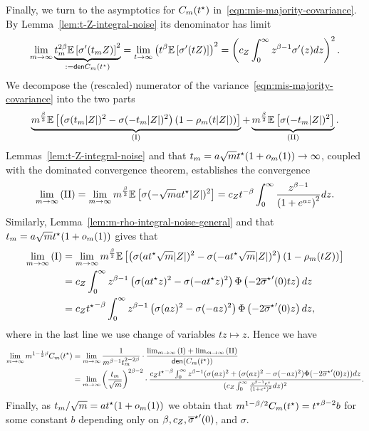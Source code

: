 Finally, we turn to the asymptotics for $C_m(t^\star)$
in~\eqref{eqn:mis-majority-covariance}.
By Lemma~\ref{lem:t-Z-integral-noise}
its denominator has limit
\begin{align*}
  \lim_{m \to \infty}
  \underbrace{t_m^{2 \beta} \mathbb{E}\left[\sigma'(t_m Z)\right]^2}_{:=
    \mathsf{den}{C_m(t^\star)}}
  = \lim_{t \to \infty}
  \left(t^\beta \mathbb{E}\left[\sigma'(t Z)\right]\right)^2
  = \left(c_Z\int_{0}^\infty z^{\beta - 1} \sigma'(z)dz\right)^2.  
\end{align*}
We decompose the (rescaled) numerator of the
variance~\eqref{eqn:mis-majority-covariance} into the two parts
\begin{align*}
  \underbrace{m^{\frac{\beta}{2}} \mathbb{E} \left[\left(
      \sigma(t_m|Z|)^2 - \sigma(-t_m |Z|)^2\right)
      (1-\rho_m(t|Z|)) \right]}_{\mathrm{(I)}}
  + \underbrace{m^{\frac{\beta}{2}} \mathbb{E} \left[\sigma(-t_m|Z|)^2\right]}_{
    \mathrm{(II)}}.
\end{align*}
Lemmas~\ref{lem:t-Z-integral-noise} and that $t_m = a \sqrt{m} t^\star(1 +
o_m(1)) \to \infty$, coupled with the dominated
convergence theorem, establishes the convergence
\begin{align*}
  \lim_{m \to \infty}  \mathrm{(II)} = \lim_{m \to \infty} m^{\frac \beta 2}
  \mathbb{E} \left[\sigma(-\sqrt{m} a t^\star |Z|)^2\right]
  = c_Z {t}^{-\beta} \int_0^\infty \frac{z^{\beta - 1}}{\left(1 + e^{a z}\right)^2}
  dz.
\end{align*}
Similarly,
Lemma~\ref{lem:m-rho-integral-noise-general} and that
$t_m = a \sqrt{m} t^\star(1 + o_m(1))$
gives that
\begin{align*}
  \lim_{m \to \infty} \mathrm{(I)} 
  & = \lim_{m \to \infty} m^{\frac \beta 2} \mathbb{E} \left[
    \left(\sigma(at^\star \sqrt{m}|Z|)^2 - \sigma(-a t^\star\sqrt{m}|Z|)^2
    \right) (1 - \rho_m(t Z)) \right] \\
  & = c_Z \int_0^\infty z^{\beta - 1}
  \left(\sigma(a t^\star z)^2 - \sigma(-at^\star z)^2\right)
  \Phi \left(-2{\overline{\sigma}^\star}'(0) t z\right) dz \\
  & = c_Z {t^\star}^{-\beta} \int_0^\infty z^{\beta - 1}
  \left(\sigma(az)^2 - \sigma(-az)^2\right)
  \Phi \left(-2{\overline{\sigma}^\star}'(0) z\right) dz,
\end{align*}
where in the last line we use change of variables $tz \mapsto z$. Hence we have
\begin{align*}
  \lim_{m\to \infty} m^{1 - \frac{1}{2} \beta} C_m(t^\star)
  & = \lim_{m \to \infty} \frac{1}{m^{\beta - 1} t_m^{2 - 2 \beta}}
  \cdot \frac{\lim_{m\to \infty}\mathrm{(I)} + \lim_{m\to \infty}\mathrm{(II)}}{
    \mathsf{den}(C_m(t^\star))} \\
  & =  \lim_{m\to \infty} \left({\frac{t_m}{\sqrt m}}\right)^{2\beta - 2}
  \cdot \frac{c_Z {t^\star}^{-\beta} \int_0^\infty z^{\beta - 1}
    ({\sigma(az)^2
      + (\sigma(az)^2 - \sigma(-az)^2) \Phi(-2{\overline{\sigma}^\star}'(0) z)})
    dz}{
    (c_Z\int_{0}^\infty \frac{z^{\beta - 1} e^{z} }{ (1 + e^{z})^2} dz)^2}.
\end{align*}
Finally, as $t_m / \sqrt{m} = a t^\star (1 + o_m(1))$ we obtain that
$m^{1 - \beta/2} C_m(t^\star) = {t^\star}^{\beta - 2} b$ for
some constant $b$ depending only on $\beta, c_Z, {\overline{\sigma}^\star}'(0)$,
and $\sigma$.
